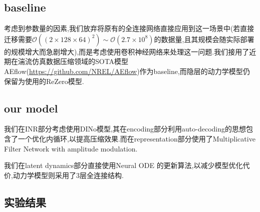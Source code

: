 \documentclass{article}
\newcommand{\mO}{\mathcal{O}}
\begin{document}
\subsection{baseline}
考虑到参数量的因素,我们放弃将原有的全连接网络直接应用到这一场景中(若直接迁移需要$\mO((2\times128\times64)^2)\sim\mO(2.7\times10^8)$的数据量,且其规模会随实际部署的规模增大而急剧增大),而是考虑使用卷积神经网络来处理这一问题.我们接用了近期在湍流仿真数据压缩领域的SOTA模型AEflow(\url{https://github.com/NREL/AEflow})\cite{AEflow}作为baseline,而隐层的动力学模型仍保留为\cite{Peyron2021LAwithAE}使用的ReZero模型\cite{bachlechner2021rezero}.
\subsection{our model}
我们在INR部分考虑使用DINo模型\cite{yin2023dino},其在encoding部分利用auto-decoding\cite{Park2019Auto-decoding}的思想包含了一个优化内循环,以提高压缩效果\cite{kim2019attentive}.而在representation部分使用了Multiplicative Filter Network\cite{fathony2021multiplicative} with amplitude modulation.

我们在latent dynamics部分直接使用Neural ODE \cite{chen2018neural}的更新算法,以减少模型优化代价,动力学模型则采用了3层全连接结构.
\subsection{实验结果}
\end{document}
